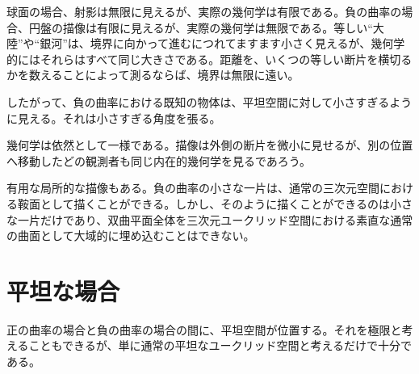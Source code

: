 球面の場合、射影は無限に見えるが、実際の幾何学は有限である。負の曲率の場合、円盤の描像は有限に見えるが、実際の幾何学は無限である。等しい``大陸''や``銀河''は、境界に向かって進むにつれてますます小さく見えるが、幾何学的にはそれらはすべて同じ大きさである。距離を、いくつの等しい断片を横切るかを数えることによって測るならば、境界は無限に遠い。

したがって、負の曲率における既知の物体は、平坦空間に対して小さすぎるように見える。それは小さすぎる角度を張る。

幾何学は依然として一様である。描像は外側の断片を微小に見せるが、別の位置へ移動したどの観測者も同じ内在的幾何学を見るであろう。

\begin{classroomqa}
\end{classroomqa}

\begin{classroomqa}
\end{classroomqa}

\begin{classroomqa}
\end{classroomqa}

有用な局所的な描像もある。負の曲率の小さな一片は、通常の三次元空間における鞍面として描くことができる。しかし、そのように描くことができるのは小さな一片だけであり、双曲平面全体を三次元ユークリッド空間における素直な通常の曲面として大域的に埋め込むことはできない。

\section{平坦な場合}

正の曲率の場合と負の曲率の場合の間に、平坦空間が位置する。それを極限と考えることもできるが、単に通常の平坦なユークリッド空間と考えるだけで十分である。


